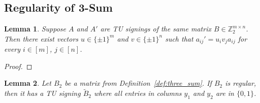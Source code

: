 \documentclass{article}
\newtheorem{lemma}{Lemma}
\theoremstyle{definition}
\begin{document}
\subsection{Regularity of 3-Sum}

\begin{lemma}\label{lem:tu_resigning}
    Suppose $A$ and $A'$ are TU signings of the same matrix $B \in \mathbb{Z}_{2}^{m \times n}$. Then there exist vectors $u \in \{\pm 1\}^{m}$ and $v \in \{\pm 1\}^{n}$ such that $a_{ij}' = u_{i} v_{j} a_{ij}$ for every $i \in [m]$, $j \in [n]$.
\end{lemma}

\begin{proof}
\end{proof}

\begin{lemma}\label{lem:three_sum_b_2_nice_signing}
    Let $B_{2}$ be a matrix from Definition~\ref{def:three_sum}. If $B_{2}$ is regular, then it has a TU signing $\tilde{B}_{2}$ where all entries in columns $y_{1}$ and $y_{2}$ are in $\{0, 1\}$.
\end{lemma}
\end{document}
